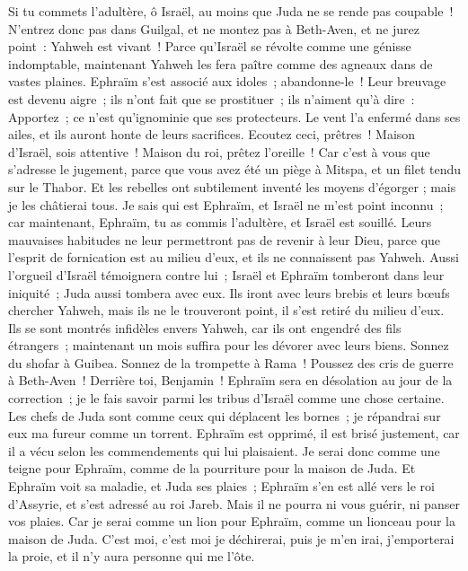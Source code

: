 \begin{multicols}{2}
Si tu commets l'adultère, ô Israël, au moins que Juda ne se rende pas coupable~! N'entrez donc pas dans Guilgal, et ne montez pas à Beth-Aven, et ne jurez point~: Yahweh est vivant~!
Parce qu'Israël se révolte comme une génisse indomptable, maintenant Yahweh les fera paître comme des agneaux dans de vastes plaines.
Ephraïm s'est associé aux idoles~; abandonne-le~!
Leur breuvage est devenu aigre~; ils n'ont fait que se prostituer~; ils n'aiment qu'à dire~: Apportez~; ce n'est qu'ignominie que ses protecteurs.
Le vent l'a enfermé dans ses ailes, et ils auront honte de leurs sacrifices.
\VerseOne{}Ecoutez ceci, prêtres~! Maison d'Israël, sois attentive~! Maison du roi, prêtez l'oreille~! Car c'est à vous que s'adresse le jugement, parce que vous avez été un piège à Mitspa, et un filet tendu sur le Thabor.
Et les rebelles ont subtilement inventé les moyens d'égorger ; mais je les châtierai tous.
Je sais qui est Ephraïm, et Israël ne m'est point inconnu~; car maintenant, Ephraïm, tu as commis l'adultère, et Israël est souillé.
Leurs mauvaises habitudes ne leur permettront pas de revenir à leur Dieu, parce que l'esprit de fornication est au milieu d'eux, et ils ne connaissent pas Yahweh.
Aussi l'orgueil d'Israël témoignera contre lui~; Israël et Ephraïm tomberont dans leur iniquité~; Juda aussi tombera avec eux.
Ils iront avec leurs brebis et leurs bœufs chercher Yahweh, mais ils ne le trouveront point, il s'est retiré du milieu d'eux.
Ils se sont montrés infidèles envers Yahweh, car ils ont engendré des fils étrangers~; maintenant un mois suffira pour les dévorer avec leurs biens.
Sonnez du shofar à Guibea. Sonnez de la trompette à Rama~! Poussez des cris de guerre à Beth-Aven~! Derrière toi, Benjamin~!
Ephraïm sera en désolation au jour de la correction~; je le fais savoir parmi les tribus d'Israël comme une chose certaine.
Les chefs de Juda sont comme ceux qui déplacent les bornes~; je répandrai sur eux ma fureur comme un torrent.
Ephraïm est opprimé, il est brisé justement, car il a vécu selon les commendements qui lui plaisaient.
Je serai donc comme une teigne pour Ephraïm, comme de la pourriture pour la maison de Juda.
Et Ephraïm voit sa maladie, et Juda ses plaies~; Ephraïm s'en est allé vers le roi d'Assyrie, et s'est adressé au roi Jareb. Mais il ne pourra ni vous guérir, ni panser vos plaies.
Car je serai comme un lion pour Ephraïm, comme un lionceau pour la maison de Juda. C'est moi, c'est moi je déchirerai, puis je m'en irai, j'emporterai la proie, et il n'y aura personne qui me l'ôte.

\end{multicols}
